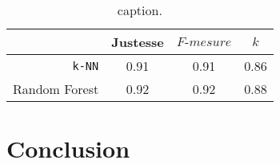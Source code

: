 \begin{table}[H]
    \centering
    \caption{caption.}
    \label{tab:l2ml_results}
    \begin{tabular}{@{}rccc@{}}
      \toprule
      \multicolumn{1}{l}{}  & Justesse  &  $F\mbox{-} mesure$  & $k$    \\ \midrule
      \texttt{k-NN}         & 0.91      & 0.91                & 0.86    \\
      Random Forest         & 0.92      & 0.92                & 0.88    \\ \bottomrule
    \end{tabular}
\end{table}

\section{Conclusion}